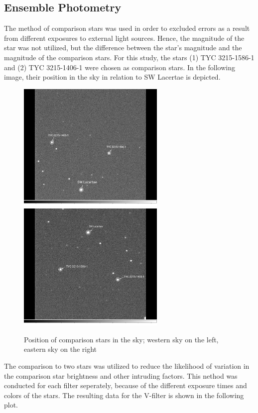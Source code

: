 \subsection{Ensemble Photometry}
  \label{sec:great}
  The method of comparison stars was used in order to excluded errors as a result 
  from different exposures to external light sources. 
  Hence, the magnitude of the star was not utilized, but the difference between the star’s 
  magnitude and the magnitude of the comparison stars. For this study, the stars 
  (1) TYC 3215-1586-1 and (2) TYC 3215-1406-1 were chosen as comparison stars. 
  In the following image, their position in the sky in relation to SW Lacertae
  is depicted.
  \begin{figure}[H]
    \centering
    \includegraphics[width=200pt]{WestHA~2.jpg}
    \hspace{1em}
    \includegraphics[width=200pt]{EastHA~2.jpg}
    \caption{Position of comparison stars in the sky; western sky on the left, eastern sky on the right}
    \label{fig:plot}
  \end{figure}
  The comparison to two stars was utilized to reduce the likelihood of 
  variation in the comparison star brightness and other intruding factors.
  This nethod was conducted for each filter seperately, because of the different 
  exposure times and colors of the stars.
  The resulting data for the V-filter is shown in the following plot.
